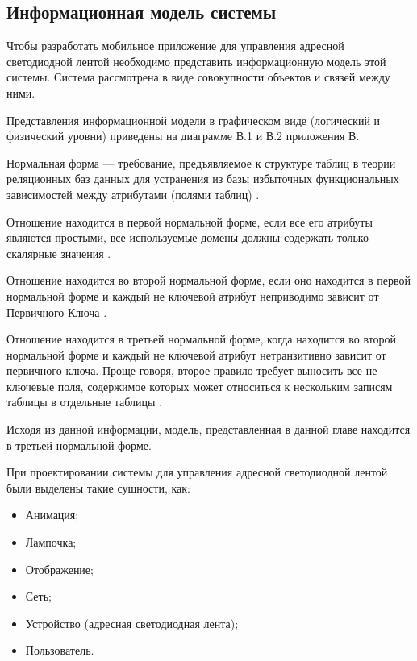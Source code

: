 \subsection{Информационная модель системы}
\label{sec:develop:umlDiagrams}

Чтобы разработать мобильное приложение для управления адресной светодиодной лентой необходимо представить информационную модель этой системы. Система рассмотрена в виде совокупности объектов и связей между ними. 

Представления информационной модели в графическом виде (логический и физический уровни) приведены на диаграмме В.1 и В.2 приложения В.

Нормальная форма — требование, предъявляемое к структуре таблиц в теории реляционных баз данных для устранения из базы избыточных функциональных зависимостей между атрибутами (полями таблиц) \cite{er_info}.

Отношение находится в первой нормальной форме, если все его атрибуты являются простыми, все используемые домены должны содержать только скалярные значения \cite{er_info}.

Отношение находится во второй нормальной форме, если оно находится в первой нормальной форме и каждый не ключевой атрибут неприводимо зависит от Первичного Ключа \cite{er_info}.

Отношение находится в третьей нормальной форме, когда находится во второй нормальной форме и каждый не ключевой атрибут нетранзитивно зависит от первичного ключа. Проще говоря, второе правило требует выносить все не ключевые поля, содержимое которых может относиться к нескольким записям таблицы в отдельные таблицы \cite{er_info}.

Исходя из данной информации, модель, представленная в данной главе находится в третьей нормальной форме.

При проектировании системы для управления адресной светодиодной лентой были выделены такие сущности, как:
\begin{itemize}
	\item Анимация;
	\item Лампочка;
	\item Отображение;
	\item Сеть;
	\item Устройство (адресная светодиодная лента);
	\item Пользователь.
\end{itemize}

